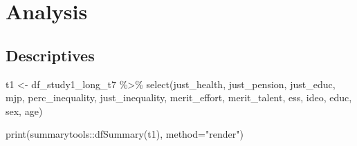 \documentclass[
  12pt,
  letterpaper,
  DIV=11,
  numbers=noendperiod]{scrartcl}
\newenvironment{Shaded}{\begin{snugshade}}{\end{snugshade}}
\newcommand{\AttributeTok}[1]{\textcolor[rgb]{0.40,0.45,0.13}{#1}}
\newcommand{\FunctionTok}[1]{\textcolor[rgb]{0.28,0.35,0.67}{#1}}
\newcommand{\NormalTok}[1]{\textcolor[rgb]{0.00,0.23,0.31}{#1}}
\newcommand{\OtherTok}[1]{\textcolor[rgb]{0.00,0.23,0.31}{#1}}
\newcommand{\SpecialCharTok}[1]{\textcolor[rgb]{0.37,0.37,0.37}{#1}}
\newcommand{\StringTok}[1]{\textcolor[rgb]{0.13,0.47,0.30}{#1}}
\begin{document}
\section{Analysis}\label{analysis}

\subsection{Descriptives}\label{descriptives}

\begin{Shaded}
\begin{Highlighting}[]
\NormalTok{t1 }\OtherTok{\textless{}{-}}\NormalTok{ df\_study1\_long\_t7 }\SpecialCharTok{\%\textgreater{}\%} 
  \FunctionTok{select}\NormalTok{(just\_health, just\_pension, just\_educ, mjp, perc\_inequality, just\_inequality, merit\_effort, merit\_talent, ess, ideo, educ, sex, age) }

\FunctionTok{print}\NormalTok{(summarytools}\SpecialCharTok{::}\FunctionTok{dfSummary}\NormalTok{(t1), }\AttributeTok{method=}\StringTok{"render"}\NormalTok{)}
\end{Highlighting}
\end{Shaded}
\end{document}
